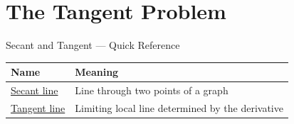 \section{The Tangent Problem}

\begin{toolkitbox}{Secant and Tangent --- Quick Reference}
\small
\begin{tabular}{l l}
\toprule
\textbf{Name} & \textbf{Meaning} \\
\midrule
\hyperref[def:secant-line]{Secant line} & Line through two points of a graph \\
\hyperref[def:tangent-line]{Tangent line} & Limiting local line determined by the derivative \\
\bottomrule
\end{tabular}
\end{toolkitbox}


